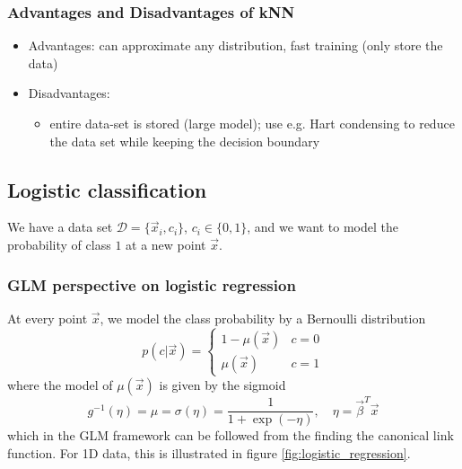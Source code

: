 
\subsubsection{Advantages and Disadvantages of kNN}
\begin{itemize}
    \item \textcolor{green1}{Advantages:} can approximate any distribution, fast training (only store the data)
    \item \textcolor{red1}{Disadvantages:}
    \begin{itemize}
        \item entire data-set is stored (large model); \textcolor{green1}{use e.g. Hart condensing to reduce the data set while keeping the decision boundary}
    \end{itemize}
\end{itemize}

\subsection{Logistic classification}

We have a data set $\mathcal{D} = \{ \vec{x}_i, c_i \}$, $c_i \in \{0, 1\}$, and we want to model the probability of class $1$ at a new point $\vec{x}$.

\subsubsection{GLM perspective on logistic regression}
At every point $\vec{x}$, we model the class probability by a Bernoulli distribution
\begin{equation}
    p(c | \vec{x}) = \begin{cases}
        1- \mu(\vec{x}) & c = 0 \\
        \mu(\vec{x}) & c = 1
    \end{cases}
\end{equation}
where the model of $\mu(\vec{x})$ is given by the sigmoid
\begin{equation}
    g^{-1}(\eta) = \mu = \sigma(\eta) = \frac{1}{1 + \exp(-\eta)}, \quad \eta = \vec{\beta}^T \vec{x}
\end{equation}
which in the GLM framework can be followed from the finding the canonical link function. For 1D data,
this is illustrated in figure \ref{fig:logistic_regression}.

